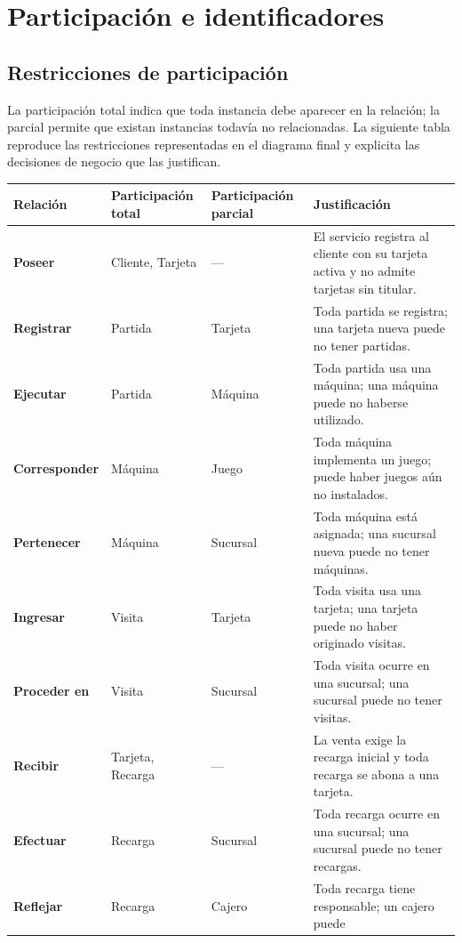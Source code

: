 \clearpage
\section{Participación e identificadores}

\subsection{Restricciones de participación}

La participación total indica que toda instancia debe aparecer en la
relación; la parcial permite que existan instancias todavía no relacionadas.
La siguiente tabla reproduce las restricciones representadas en el diagrama
final y explicita las decisiones de negocio que las justifican.

\begin{center}
\fontsize{7.2}{8.1}\selectfont
\renewcommand{\arraystretch}{0.92}
\begin{tabularx}{\textwidth}{@{}>{\bfseries\color{unamblue}}p{}p{}p{}X@{}}
\toprule
Relación & Participación total & Participación parcial & Justificación \\
\midrule
Poseer & Cliente, Tarjeta & --- & El servicio registra al cliente con su
tarjeta activa y no admite tarjetas sin titular. \\
Registrar & Partida & Tarjeta & Toda partida se registra; una tarjeta nueva
puede no tener partidas. \\
Ejecutar & Partida & Máquina & Toda partida usa una máquina; una máquina puede
no haberse utilizado. \\
Corresponder & Máquina & Juego & Toda máquina implementa un juego; puede haber
juegos aún no instalados. \\
Pertenecer & Máquina & Sucursal & Toda máquina está asignada; una sucursal
nueva puede no tener máquinas. \\
Ingresar & Visita & Tarjeta & Toda visita usa una tarjeta; una tarjeta puede no
haber originado visitas. \\
Proceder en & Visita & Sucursal & Toda visita ocurre en una sucursal; una
sucursal puede no tener visitas. \\
Recibir & Tarjeta, Recarga & --- & La venta exige la recarga inicial y toda
recarga se abona a una tarjeta. \\
Efectuar & Recarga & Sucursal & Toda recarga ocurre en una sucursal; una
sucursal puede no tener recargas. \\
Reflejar & Recarga & Cajero & Toda recarga tiene responsable; un cajero puede

\end{tabularx}
\end{center}
